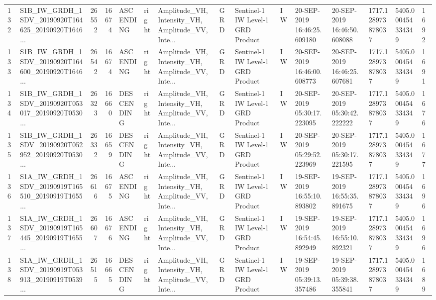 \begin{tabular}{llrrlllllllllll}
132 &  S1B\_IW\_GRDH\_1SDV\_20190920T164625\_20190920T1646... &  26552 &   16674 &   ASCENDING &  right &  Amplitude\_VH, Intensity\_VH, Amplitude\_VV, Inte... &          GRD &  Sentinel-1 IW Level-1 GRD Product &              IW &  20-SEP-2019 16:46:25.609180 &  20-SEP-2019 16:46:50.608088 &          1717.128973878037 &  5405.000454334349 &       1692 \\
133 &  S1B\_IW\_GRDH\_1SDV\_20190920T164600\_20190920T1646... &  26542 &   16674 &   ASCENDING &  right &  Amplitude\_VH, Intensity\_VH, Amplitude\_VV, Inte... &          GRD &  Sentinel-1 IW Level-1 GRD Product &              IW &  20-SEP-2019 16:46:00.608773 &  20-SEP-2019 16:46:25.607681 &          1717.128973878037 &  5405.000454334349 &       1691 \\
134 &  S1B\_IW\_GRDH\_1SDV\_20190920T053017\_20190920T0530... &  26323 &   16660 &  DESCENDING &  right &  Amplitude\_VH, Intensity\_VH, Amplitude\_VV, Inte... &          GRD &  Sentinel-1 IW Level-1 GRD Product &              IW &  20-SEP-2019 05:30:17.223095 &  20-SEP-2019 05:30:42.222222 &          1717.128973878037 &  5405.000454334349 &       1676 \\
135 &  S1B\_IW\_GRDH\_1SDV\_20190920T052952\_20190920T0530... &  26332 &   16659 &  DESCENDING &  right &  Amplitude\_VH, Intensity\_VH, Amplitude\_VV, Inte... &          GRD &  Sentinel-1 IW Level-1 GRD Product &              IW &  20-SEP-2019 05:29:52.223969 &  20-SEP-2019 05:30:17.221595 &          1717.128973878037 &  5405.000454334349 &       1677 \\
136 &  S1A\_IW\_GRDH\_1SDV\_20190919T165510\_20190919T1655... &  26616 &   16675 &   ASCENDING &  right &  Amplitude\_VH, Intensity\_VH, Amplitude\_VV, Inte... &          GRD &  Sentinel-1 IW Level-1 GRD Product &              IW &  19-SEP-2019 16:55:10.893802 &  19-SEP-2019 16:55:35.891675 &          1717.128973878037 &  5405.000454334349 &       1696 \\
137 &  S1A\_IW\_GRDH\_1SDV\_20190919T165445\_20190919T1655... &  26607 &   16676 &   ASCENDING &  right &  Amplitude\_VH, Intensity\_VH, Amplitude\_VV, Inte... &          GRD &  Sentinel-1 IW Level-1 GRD Product &              IW &  19-SEP-2019 16:54:45.892949 &  19-SEP-2019 16:55:10.892321 &          1717.128973878037 &  5405.000454334349 &       1696 \\
138 &  S1A\_IW\_GRDH\_1SDV\_20190919T053913\_20190919T0539... &  26515 &   16665 &  DESCENDING &  right &  Amplitude\_VH, Intensity\_VH, Amplitude\_VV, Inte... &          GRD &  Sentinel-1 IW Level-1 GRD Product &              IW &  19-SEP-2019 05:39:13.357486 &  19-SEP-2019 05:39:38.355841 &          1717.128973878037 &  5405.000454334349 &       1689 \\

\end{tabular}
